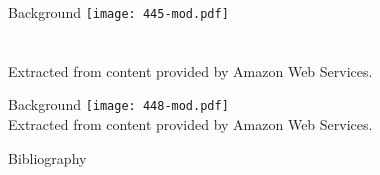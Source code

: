 \documentclass[t,handout]{beamer}   %
\begin{document}
\begin{frame}{Background}
 	\texttt{[image: 445-mod.pdf]} \\~\\~\\
 	{\tiny Extracted from content provided by Amazon Web Services\cite{Aws:15}.}
\end{frame}

\begin{frame}{Background}
 	\texttt{[image: 448-mod.pdf]} \\
 	{\tiny Extracted from content provided by Amazon Web Services\cite{Aws:15}.}
\end{frame}

\begin{frame}[allowframebreaks]{Bibliography}
 	\def\newblock{}	
	\printbibliography
\end{frame}
\end{document}
